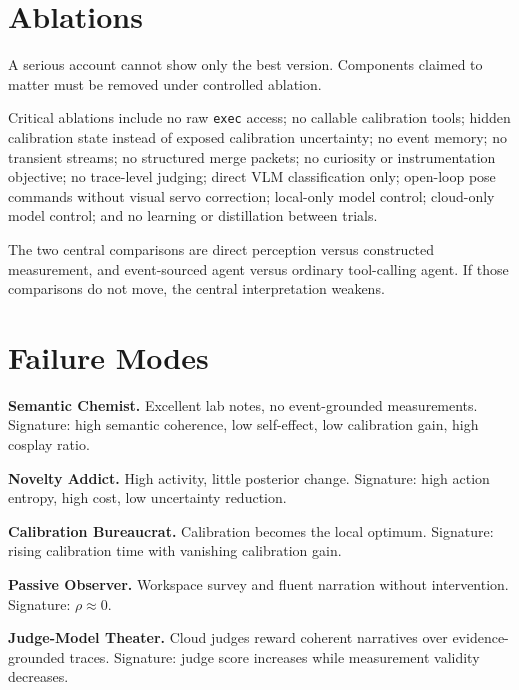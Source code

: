 \documentclass[11pt]{article}
\begin{document}
\section{Ablations}

A serious account cannot show only the best version. Components claimed to matter must be removed under controlled ablation.

Critical ablations include no raw \texttt{exec} access; no callable calibration tools; hidden calibration state instead of exposed calibration uncertainty; no event memory; no transient streams; no structured merge packets; no curiosity or instrumentation objective; no trace-level judging; direct VLM classification only; open-loop pose commands without visual servo correction; local-only model control; cloud-only model control; and no learning or distillation between trials.

The two central comparisons are direct perception versus constructed measurement, and event-sourced agent versus ordinary tool-calling agent. If those comparisons do not move, the central interpretation weakens.

\section{Failure Modes}

\begin{falsifybox}
\textbf{Semantic Chemist.} Excellent lab notes, no event-grounded measurements. Signature: high semantic coherence, low self-effect, low calibration gain, high cosplay ratio.
\end{falsifybox}

\begin{falsifybox}
\textbf{Novelty Addict.} High activity, little posterior change. Signature: high action entropy, high cost, low uncertainty reduction.
\end{falsifybox}

\begin{falsifybox}
\textbf{Calibration Bureaucrat.} Calibration becomes the local optimum. Signature: rising calibration time with vanishing calibration gain.
\end{falsifybox}

\begin{falsifybox}
\textbf{Passive Observer.} Workspace survey and fluent narration without intervention. Signature: $\rho\approx 0$.
\end{falsifybox}

\begin{falsifybox}
\textbf{Judge-Model Theater.} Cloud judges reward coherent narratives over evidence-grounded traces. Signature: judge score increases while measurement validity decreases.
\end{falsifybox}
\end{document}
